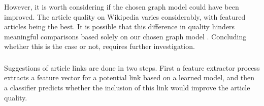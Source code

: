 However, it is worth considering if the chosen graph model could have been improved. The article quality on Wikipedia varies considerably, with featured articles being the best. It is possible that this difference in quality hinders meaningful comparisons based solely on our chosen graph model . Concluding whether this is the case or not, requires further investigation. 





\subsubsection*{\subproblemtwo}
Suggestions of article links are done in two steps. First a feature extractor process extracts a feature vector for a potential link based on a learned model, and then a classifier predicts whether the inclusion of this link would improve the article quality.

